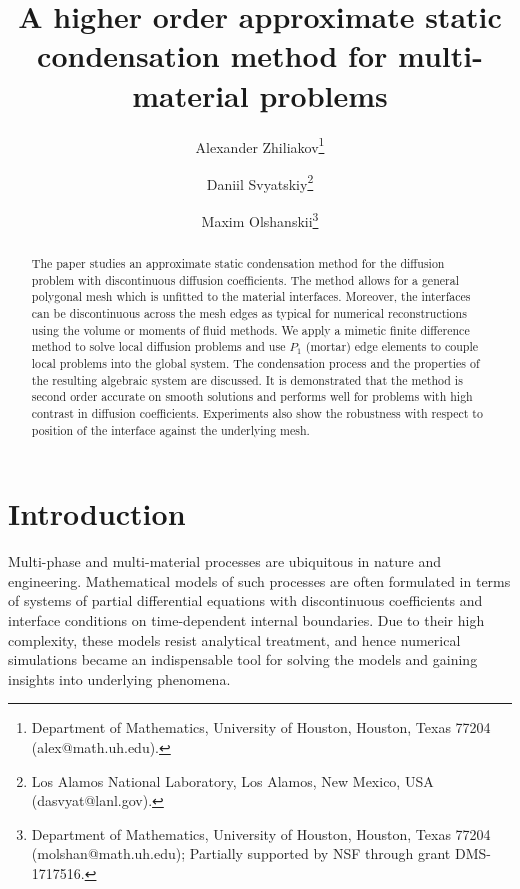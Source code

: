 \documentclass[12pt]{article}
\newcommand{\Sasha}[1]{\colorbox{Cyan}{\textbf{Sasha}:} #1}
\begin{document}
	
\title{A higher order approximate static condensation method for multi-material problems}
\author{
Alexander Zhiliakov\thanks{Department of Mathematics, University of Houston, Houston, Texas 77204 (alex@math.uh.edu).}
\and Daniil Svyatskiy\thanks{Los Alamos National Laboratory, Los Alamos,
New Mexico, USA (dasvyat@lanl.gov).}
\and
Maxim Olshanskii\thanks{Department of Mathematics, University of Houston, Houston, Texas 77204 (molshan@math.uh.edu); Partially supported by NSF through grant  DMS-1717516.}
}

\maketitle

\let\oldtabular\tabular
\renewcommand{\tabular}[1][1.5]{\def\arraystretch{#1}\oldtabular}

\begin{abstract}
The paper studies an approximate static condensation method for the diffusion problem with discontinuous diffusion coefficients. The method allows for a general polygonal mesh which is unfitted to the material interfaces. Moreover, the interfaces can be discontinuous across the mesh edges as typical for numerical reconstructions using the volume or moments of fluid methods.  We apply a mimetic finite difference method to solve local diffusion problems and use $P_1$ (mortar) edge elements to couple local problems into the global system. The condensation process and the properties of the resulting algebraic system are discussed. It is demonstrated that the method is second order accurate on smooth solutions and performs well for problems with high contrast in diffusion coefficients. Experiments also show the robustness with respect to position of the interface against the underlying mesh.
\end{abstract}


\section{Introduction}
 Multi-phase and multi-material processes are ubiquitous in nature and engineering.
 Mathematical models of such processes are often formulated in terms of systems of partial differential equations with discontinuous coefficients and interface conditions on time-dependent internal boundaries.
 Due to their high complexity, these models   resist analytical treatment, and hence numerical simulations became an indispensable tool for solving the models and gaining insights into underlying phenomena.
\end{document}
